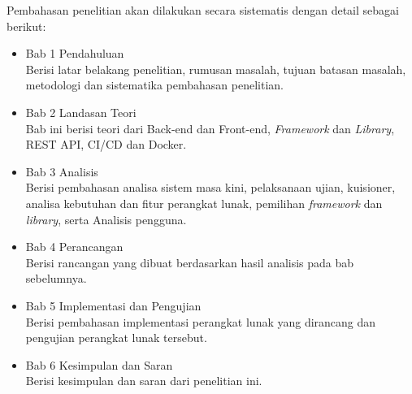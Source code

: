 Pembahasan penelitian akan dilakukan secara sistematis dengan detail sebagai
berikut:

\begin{itemize}
    \item Bab 1 Pendahuluan \\
        Berisi latar belakang penelitian, rumusan masalah, tujuan batasan
        masalah, metodologi dan sistematika pembahasan penelitian.
    
    \item Bab 2 Landasan Teori \\
        Bab ini berisi teori dari Back-end dan Front-end, \textit{Framework} dan
        \textit{Library}, REST API, CI/CD dan Docker.
        
    \item Bab 3 Analisis \\
        Berisi pembahasan analisa sistem masa kini, pelaksanaan ujian,
        kuisioner, analisa kebutuhan dan fitur perangkat lunak, pemilihan
        \textit{framework} dan \textit{library}, serta Analisis pengguna.
        
    \item Bab 4 Perancangan \\
        Berisi rancangan yang dibuat berdasarkan hasil analisis pada bab
        sebelumnya.
    
    \item Bab 5 Implementasi dan Pengujian \\
        Berisi pembahasan implementasi perangkat lunak yang dirancang dan
        pengujian perangkat lunak tersebut.
        
    \item Bab 6 Kesimpulan dan Saran \\
        Berisi kesimpulan dan saran dari penelitian ini.
\end{itemize}